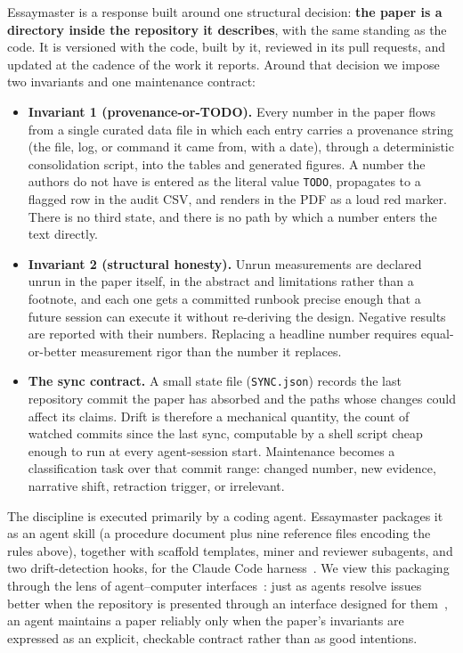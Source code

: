 \documentclass{article}
\begin{document}
Essaymaster is a response built around one structural decision: \textbf{the paper is a
directory inside the repository it describes}, with the same standing as the code. It
is versioned with the code, built by it, reviewed in its pull requests, and updated at
the cadence of the work it reports. Around that decision we impose two invariants and
one maintenance contract:

\begin{itemize}
  \item \textbf{Invariant 1 (provenance-or-TODO).} Every number in the paper flows
  from a single curated data file in which each entry carries a provenance string (the
  file, log, or command it came from, with a date), through a deterministic
  consolidation script, into the tables and generated figures. A number the authors do
  not have is entered as the literal value \texttt{TODO}, propagates to a flagged row
  in the audit CSV, and renders in the PDF as a loud red marker. There is no third
  state, and there is no path by which a number enters the text directly.
  \item \textbf{Invariant 2 (structural honesty).} Unrun measurements are declared
  unrun in the paper itself, in the abstract and limitations rather than a footnote,
  and each one gets a committed runbook precise enough that a future session can
  execute it without re-deriving the design. Negative results are reported with their
  numbers. Replacing a headline number requires equal-or-better measurement rigor
  than the number it replaces.
  \item \textbf{The sync contract.} A small state file (\texttt{SYNC.json}) records
  the last repository commit the paper has absorbed and the paths whose changes could
  affect its claims. Drift is therefore a mechanical quantity, the count of watched
  commits since the last sync, computable by a shell script cheap enough to run at
  every agent-session start. Maintenance becomes a classification task over that
  commit range: changed number, new evidence, narrative shift, retraction trigger, or
  irrelevant.
\end{itemize}

The discipline is executed primarily by a coding agent. Essaymaster packages it as an
agent skill (a procedure document plus nine reference files encoding the rules
above), together with scaffold templates, miner and reviewer subagents, and two
drift-detection hooks, for the Claude Code harness~\citep{claudecode}. We view this packaging
through the lens of agent--computer interfaces~\citep{yang2024sweagent}: just as
agents resolve issues better when the repository is presented through an interface
designed for them~\citep{jimenez2024swebench}, an agent maintains a paper reliably
only when the paper's invariants are expressed as an explicit, checkable contract
rather than as good intentions.
\end{document}
